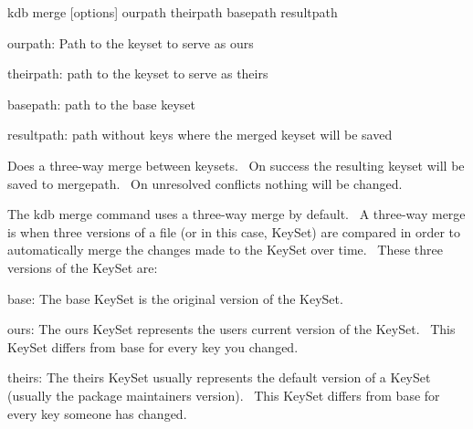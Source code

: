 {\ttfamily kdb merge \mbox{[}options\mbox{]} ourpath theirpath basepath resultpath}~\newline



\begin{DoxyItemize}
\item ourpath\+: Path to the keyset to serve as {\ttfamily ours}~\newline

\item theirpath\+: path to the keyset to serve as {\ttfamily theirs}~\newline

\item basepath\+: path to the {\ttfamily base} keyset~\newline

\item resultpath\+: path without keys where the merged keyset will be saved~\newline

\end{DoxyItemize}

Does a three-\/way merge between keysets.~\newline
 On success the resulting keyset will be saved to mergepath.~\newline
 On unresolved conflicts nothing will be changed.~\newline


The {\ttfamily kdb merge} command uses a three-\/way merge by default.~\newline
 A three-\/way merge is when three versions of a file (or in this case, Key\+Set) are compared in order to automatically merge the changes made to the Key\+Set over time.~\newline
 These three versions of the Key\+Set are\+:~\newline



\begin{DoxyItemize}
\item {\ttfamily base}\+: The {\ttfamily base} Key\+Set is the original version of the Key\+Set.~\newline

\item {\ttfamily ours}\+: The {\ttfamily ours} Key\+Set represents the user\textquotesingle{}s current version of the Key\+Set.~\newline
 This Key\+Set differs from {\ttfamily base} for every key you changed.~\newline

\item {\ttfamily theirs}\+: The {\ttfamily theirs} Key\+Set usually represents the default version of a Key\+Set (usually the package maintainer\textquotesingle{}s version).~\newline
 This Key\+Set differs from {\ttfamily base} for every key someone has changed.~\newline

\end{DoxyItemize}

